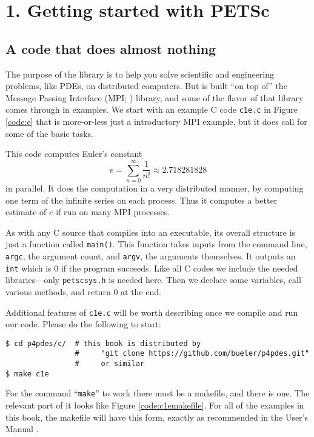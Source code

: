 
\chapter{1. Getting started with PETSc}

\section{A code that does almost nothing}

The purpose of the \PETSc library is to help you solve scientific and engineering problems, like PDEs, on distributed computers.  But \PETSc is built ``on top of'' the Message Passing Interface (MPI; \citep{Groppetal1999}) library, and some of the flavor of that library comes through in examples.  We start with an example C code \texttt{c1e.c} in Figure \ref{code:e} that is more-or-less just a introductory MPI example, but it does call \PETSc for some of the basic tasks.

This code computes Euler's constant
  $$e = \sum_{n = 0}^\infty \frac{1}{n!} \approx 2.718281828$$
in parallel.  It does the computation in a very distributed manner, by computing one term of the infinite series on each process.  Thus it computes a better estimate of $e$ if run on many MPI processes.

As with any C source that compiles into an executable, its overall structure is just a function called \texttt{main()}.  This function takes inputs from the command line, \texttt{argc}, the argument count, and \texttt{argv}, the arguments themselves.  It outputs an \texttt{int} which is $0$ if the program succeeds.  Like all C codes we include the needed libraries---only \texttt{petscsys.h} is needed here.  Then we declare some variables, call various methods, and return $0$ at the end.

Additional features of \texttt{c1e.c} will be worth describing once we compile and run our code.  Please do the following to start:
\begin{Verbatim}[fontsize=\small]
$ cd p4pdes/c/  # this book is distributed by
                #     "git clone https://github.com/bueler/p4pdes.git"
                #     or similar
$ make c1e
\end{Verbatim}
For the command ``\texttt{make}'' to work there must be a makefile, and there is one.  The relevant part of it looks like Figure \ref{code:c1emakefile}.  For all of the \PETSc examples in this book, the makefile will have this form, exactly as recommended in the \PETSc User's Manual \citep{petsc-user-ref}.

